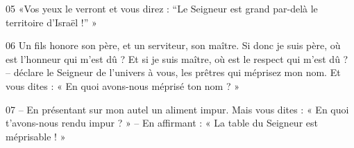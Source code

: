 
05 «Vos yeux le verront et vous direz : “Le Seigneur est grand par-delà le territoire d’Israël !” »

06 Un fils honore son père, et un serviteur, son maître. Si donc je suis père, où est l’honneur qui m’est dû ? Et si je suis maître, où est le respect qui m’est dû ? – déclare le Seigneur de l’univers à vous, les prêtres qui méprisez mon nom. Et vous dites : « En quoi avons-nous méprisé ton nom ? »

07 – En présentant sur mon autel un aliment impur. Mais vous dites : « En quoi t’avons-nous rendu impur ? » – En affirmant : « La table du Seigneur est méprisable ! »
